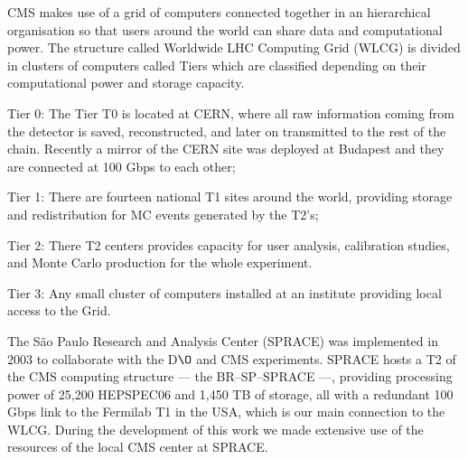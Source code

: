 CMS makes use of a grid of computers connected together in an hierarchical organisation so that users around the world can share data and computational power. The structure called Worldwide LHC Computing Grid (WLCG) is divided in clusters of computers called Tiers which are classified depending on their computational power and storage capacity.
\begin{compact_itemize}
\item Tier 0: The Tier T0 is located at CERN, where all raw information coming from the detector is saved, reconstructed, and later on transmitted to the rest of the chain. Recently a mirror of the CERN site was deployed at Budapest and they are connected at 100 Gbps to each other;
\item Tier 1: There are fourteen national T1 sites around the world, providing storage and redistribution for MC events generated by the T2's;
\item Tier 2: There T2 centers provides capacity for user analysis, calibration studies, and Monte Carlo production for the whole experiment.   
\item Tier 3: Any small cluster of computers installed at an institute providing local access to the Grid.
\end{compact_itemize}

The S\~ao Paulo Research and Analysis Center (SPRACE) \cite{sprace} was implemented in 2003 to collaborate with the D$\O$ and CMS experiments. SPRACE hosts a T2 of the CMS computing structure --- the BR--SP--SPRACE ---, providing processing power of 25,200 HEPSPEC06 and 1,450 TB of storage, all with a redundant 100 Gbps link to the Fermilab T1 in the USA, which is our main connection to the WLCG. During the development of this work we made extensive use of  the resources of the local CMS center at SPRACE.





